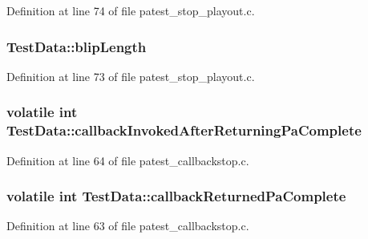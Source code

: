 Definition at line 74 of file patest\+\_\+stop\+\_\+playout.\+c.

\subsubsection[{\texorpdfstring{blip\+Length}{blipLength}}]{ Test\+Data\+::blip\+Length}\hypertarget{struct_test_data_a2984e6635b09b4c89d3f0fafe5bf89fc}{}\label{struct_test_data_a2984e6635b09b4c89d3f0fafe5bf89fc}


Definition at line 73 of file patest\+\_\+stop\+\_\+playout.\+c.

\subsubsection[{\texorpdfstring{callback\+Invoked\+After\+Returning\+Pa\+Complete}{callbackInvokedAfterReturningPaComplete}}]{\setlength{\rightskip}{0pt plus 5cm}volatile {\bf int} Test\+Data\+::callback\+Invoked\+After\+Returning\+Pa\+Complete}\hypertarget{struct_test_data_aeb6d0c0601a66a26b41e97f00ee6edbb}{}\label{struct_test_data_aeb6d0c0601a66a26b41e97f00ee6edbb}


Definition at line 64 of file patest\+\_\+callbackstop.\+c.

\subsubsection[{\texorpdfstring{callback\+Returned\+Pa\+Complete}{callbackReturnedPaComplete}}]{\setlength{\rightskip}{0pt plus 5cm}volatile {\bf int} Test\+Data\+::callback\+Returned\+Pa\+Complete}\hypertarget{struct_test_data_a2fe061a08b53bcfe897fb3bfe2ccbd23}{}\label{struct_test_data_a2fe061a08b53bcfe897fb3bfe2ccbd23}


Definition at line 63 of file patest\+\_\+callbackstop.\+c.

